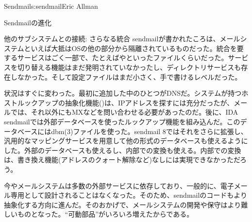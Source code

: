 \begin{aosachapter}{Sendmail}{s:sendmail}{Eric Allman}
\begin{aosasect1}{Sendmailの進化}
\begin{aosasect2}{他のサブシステムとの接続: さらなる統合}
sendmailが書かれたころは、メールシステムといえば大抵はOSの他の部分から隔離されているものだった。統合を要するサービスはごく一部で、たとえばやといったファイルくらいだった。サービスを切り替える機能はまだ発明されていなかったし、ディレクトリサービスも存在しなかった。そして設定ファイルはまだ小さく、手で書けるレベルだった。

状況はすぐに変わった。最初に追加した中のひとつがDNSだ。システムが持つホストルックアップの抽象化機能()は、IPアドレスを探すには充分だったが、メールでは、それ以外にもMXなどを問い合わせる必要があったのだ。後に、IDA sendmailでは外部データベースを使ったルックアップ機能を組み込んだ。このデータベースにはdbm(3)ファイルを使った。sendmail 8ではそれをさらに拡張し、汎用的なマッピングサービスを用意して他の形式のデータベースも使えるようにした。外部のデータベースも使えるし、内部での変換も使える。内部での変換は、書き換え機能(アドレスのクォート解除など)なしには実現できなかっただろう。

今やメールシステムは多数の外部サービスに依存しており、一般的に、電子メール専用として設計されることはなくなった。そのため、sendmailのコードもより抽象化する方向に進んだ。そのおかげで、メールシステムの開発や保守はより難しいものとなった。``可動部品''がいろいろ増えたからである。

\end{aosasect2}


\end{aosasect1}
\end{aosachapter}
